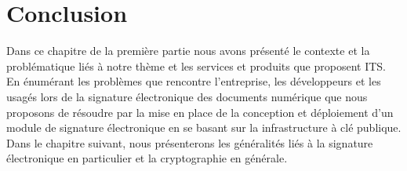 	\section*{Conclusion}
		Dans ce chapitre de la première partie nous avons présenté le contexte et la problématique liés à notre thème et les services et produits que proposent ITS. En énumérant les problèmes que rencontre l'entreprise, les développeurs et les usagés lors de la signature électronique des documents numérique que nous proposons de résoudre par la mise en place de la conception et déploiement d'un module de signature électronique en se basant sur la infrastructure à clé publique. Dans le chapitre suivant, nous présenterons les généralités liés à la signature électronique en particulier et la cryptographie en générale.
